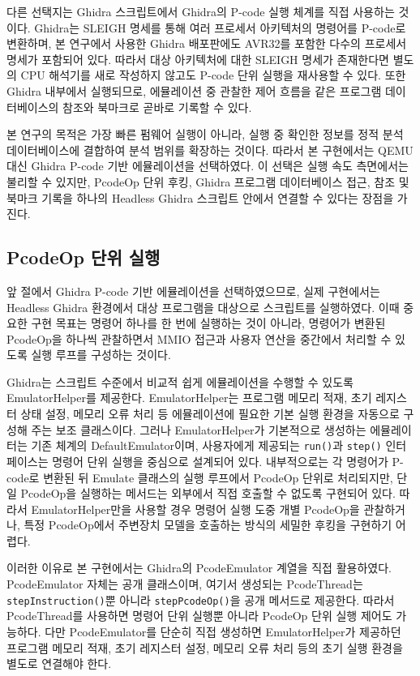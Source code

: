 \documentclass[master,korean,final]{kaist-ucs}
\begin{document}
다른 선택지는 Ghidra 스크립트에서 Ghidra의 P-code 실행 체계를 직접 사용하는 것이다. Ghidra는 SLEIGH 명세를 통해 여러 프로세서 아키텍처의 명령어를 P-code로 변환하며, 본 연구에서 사용한 Ghidra 배포판에도 AVR32를 포함한 다수의 프로세서 명세가 포함되어 있다\cite{Ghidra,SLEIGH}. 따라서 대상 아키텍처에 대한 SLEIGH 명세가 존재한다면 별도의 CPU 해석기를 새로 작성하지 않고도 P-code 단위 실행을 재사용할 수 있다. 또한 Ghidra 내부에서 실행되므로, 에뮬레이션 중 관찰한 제어 흐름을 같은 프로그램 데이터베이스의 참조와 북마크로 곧바로 기록할 수 있다.

본 연구의 목적은 가장 빠른 펌웨어 실행이 아니라, 실행 중 확인한 정보를 정적 분석 데이터베이스에 결합하여 분석 범위를 확장하는 것이다. 따라서 본 구현에서는 QEMU 대신 Ghidra P-code 기반 에뮬레이션을 선택하였다. 이 선택은 실행 속도 측면에서는 불리할 수 있지만, PcodeOp 단위 후킹, Ghidra 프로그램 데이터베이스 접근, 참조 및 북마크 기록을 하나의 Headless Ghidra 스크립트 안에서 연결할 수 있다는 장점을 가진다.

\subsection{PcodeOp 단위 실행}

앞 절에서 Ghidra P-code 기반 에뮬레이션을 선택하였으므로, 실제 구현에서는 Headless Ghidra 환경에서 대상 프로그램을 대상으로 스크립트를 실행하였다. 이때 중요한 구현 목표는 명령어 하나를 한 번에 실행하는 것이 아니라, 명령어가 변환된 PcodeOp을 하나씩 관찰하면서 MMIO 접근과 사용자 연산을 중간에서 처리할 수 있도록 실행 루프를 구성하는 것이다.

Ghidra는 스크립트 수준에서 비교적 쉽게 에뮬레이션을 수행할 수 있도록 EmulatorHelper를 제공한다. EmulatorHelper는 프로그램 메모리 적재, 초기 레지스터 상태 설정, 메모리 오류 처리 등 에뮬레이션에 필요한 기본 실행 환경을 자동으로 구성해 주는 보조 클래스이다. 그러나 EmulatorHelper가 기본적으로 생성하는 에뮬레이터는 기존 체계의 DefaultEmulator이며, 사용자에게 제공되는 \texttt{run()}과 \texttt{step()} 인터페이스는 명령어 단위 실행을 중심으로 설계되어 있다. 내부적으로는 각 명령어가 P-code로 변환된 뒤 Emulate 클래스의 실행 루프에서 PcodeOp 단위로 처리되지만, 단일 PcodeOp을 실행하는 메서드는 외부에서 직접 호출할 수 없도록 구현되어 있다. 따라서 EmulatorHelper만을 사용할 경우 명령어 실행 도중 개별 PcodeOp을 관찰하거나, 특정 PcodeOp에서 주변장치 모델을 호출하는 방식의 세밀한 후킹을 구현하기 어렵다.

이러한 이유로 본 구현에서는 Ghidra의 PcodeEmulator 계열을 직접 활용하였다. PcodeEmulator 자체는 공개 클래스이며, 여기서 생성되는 PcodeThread는 \texttt{stepInstruction()}뿐 아니라 \texttt{stepPcodeOp()}을 공개 메서드로 제공한다. 따라서 PcodeThread를 사용하면 명령어 단위 실행뿐 아니라 PcodeOp 단위 실행 제어도 가능하다. 다만 PcodeEmulator를 단순히 직접 생성하면 EmulatorHelper가 제공하던 프로그램 메모리 적재, 초기 레지스터 설정, 메모리 오류 처리 등의 초기 실행 환경을 별도로 연결해야 한다.
\end{document}

